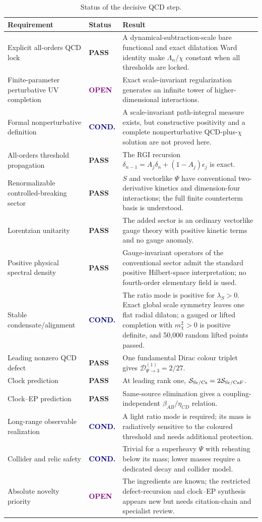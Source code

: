 \documentclass[11pt,a4paper]{article}
\newcommand{\Pass}{\textcolor{deepgreen}{\textbf{PASS}}}
\newcommand{\Open}{\textcolor{purple}{\textbf{OPEN}}}
\newcommand{\Conditional}{\textcolor{navy}{\textbf{COND.}}}
\begin{document}
\begin{table}[H]
\centering
\caption{Status of the decisive QCD step.}
\begin{tabularx}{\textwidth}{@{}L{0.30\textwidth}L{0.12\textwidth}Y@{}}
\toprule
Requirement & Status & Result \\
\midrule
Explicit all-orders QCD lock & \Pass & A dynamical-subtraction-scale bare functional and exact dilatation Ward identity make $\Lambda_n/\chi$ constant when all thresholds are locked. \\
Finite-parameter perturbative UV completion & \Open & Exact scale-invariant regularization generates an infinite tower of higher-dimensional interactions. \\
Formal nonperturbative definition & \Conditional & A scale-invariant path-integral measure exists, but constructive positivity and a complete nonperturbative QCD-plus-$\chi$ solution are not proved here. \\
All-orders threshold propagation & \Pass & The RGI recursion $\delta_{n-1}=A_j\delta_n+(1-A_j)\epsilon_j$ is exact. \\
Renormalizable controlled-breaking sector & \Pass & $S$ and vectorlike $\Psi$ have conventional two-derivative kinetics and dimension-four interactions; the full finite counterterm basis is understood. \\
Lorentzian unitarity & \Pass & The added sector is an ordinary vectorlike gauge theory with positive kinetic terms and no gauge anomaly. \\
Positive physical spectral density & \Pass & Gauge-invariant operators of the conventional sector admit the standard positive Hilbert-space interpretation; no fourth-order elementary field is used. \\
Stable condensate/alignment & \Conditional & The ratio mode is positive for $\lambda_S>0$. Exact global scale symmetry leaves one flat radial dilaton; a gauged or lifted completion with $m_\chi^2>0$ is positive definite, and 50,000 random lifted points passed. \\
Leading nonzero QCD defect & \Pass & One fundamental Dirac colour triplet gives $\mathcal D_{\Psi\to3}^{(1)}=2/27$. \\
Clock prediction & \Pass & At leading rank one, $\mathcal S_{\rm Sr/Cs}=2\mathcal S_{\rm Sr/CaF}$. \\
Clock--EP prediction & \Pass & Same-source elimination gives a coupling-independent $\beta_{AB}/\eta_{CD}$ relation. \\
Long-range observable realization & \Conditional & A light ratio mode is required; its mass is radiatively sensitive to the coloured threshold and needs additional protection. \\
Collider and relic safety & \Conditional & Trivial for a superheavy $\Psi$ with reheating below its mass; lower masses require a dedicated decay and collider model. \\
Absolute novelty priority & \Open & The ingredients are known; the restricted defect-recursion and clock--EP synthesis appears new but needs citation-chain and specialist review. \\
\bottomrule
\end{tabularx}
\end{table}
\end{document}

